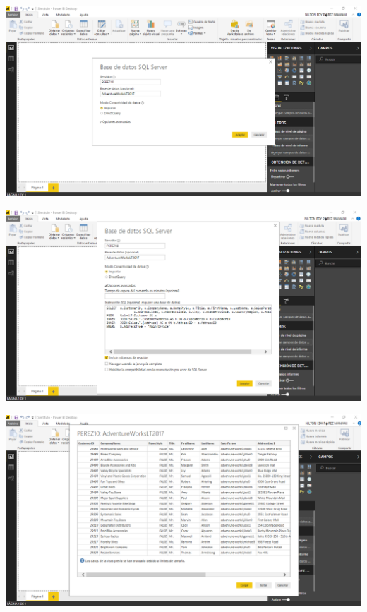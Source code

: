 \begin{center}
\includegraphics[width=15cm]{./Imagenes/imagen2}
\end{center}

\begin{center}
\includegraphics[width=15cm]{./Imagenes/imagen3}
\end{center}

\begin{center}
\includegraphics[width=15cm]{./Imagenes/imagen4}
\end{center}

